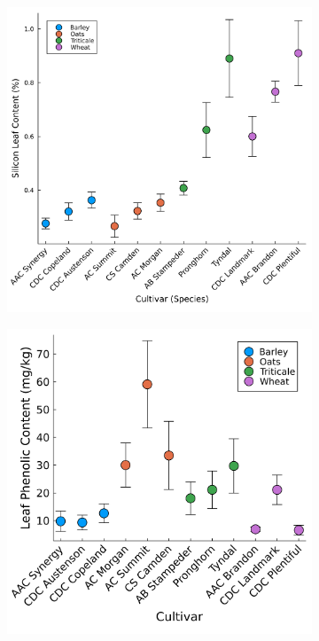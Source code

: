 \documentclass[12pt, letterpaper, ]{report}
\begin{document}
\begin{figure}[h]
        \centering
        \begin{subfigure}[b]{0.45\textwidth}
                \centering
                \includegraphics[width = \textwidth]{images/spp_si_content.png}
        \end{subfigure}
        \hfill
        \begin{subfigure}[b]{0.45\textwidth}
                \centering
                \includegraphics[width = \textwidth]{images/spp_phenolic_content.png}
        \end{subfigure}
                

\end{figure}
\end{document}
